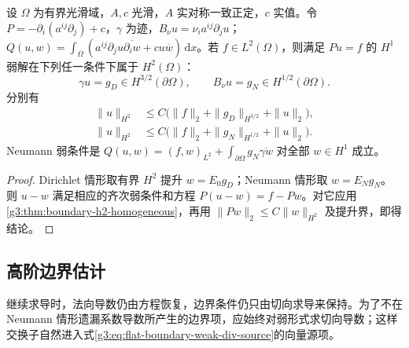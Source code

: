 \begin{corollary}\label{g3:cor:boundary-h2-inhomogeneous}
	设 \(\Omega\) 为有界光滑域，\(A,c\) 光滑，\(A\) 实对称一致正定，\(c\) 实值。令 \(P=-\partial_i(a^{ij}\partial_j)+c\)，\(\gamma\) 为迹，\(B_\nu u=\nu_i a^{ij}\partial_ju\)；\(Q(u,w)=\int_\Omega(a^{ij}\partial_ju\overline{\partial_iw}+cu\overline w)\,\mathrm dx\)。若 \(f\in L^2(\Omega)\)，则满足 \(Pu=f\) 的 \(H^1\) 弱解在下列任一条件下属于 \(H^2(\Omega)\)：
	\[
	\gamma u=g_D\in H^{3/2}(\partial\Omega),\qquad
	B_\nu u=g_N\in H^{1/2}(\partial\Omega).
	\]
	分别有
	\[
	\begin{split}
	\|u\|_{H^2}&\le C\bigl(\|f\|_2+\|g_D\|_{H^{3/2}}+\|u\|_2\bigr),\\
	\|u\|_{H^2}&\le C\bigl(\|f\|_2+\|g_N\|_{H^{1/2}}+\|u\|_2\bigr).
	\end{split}
	\]
	Neumann 弱条件是
	\(Q(u,w)=(f,w)_{L^2}+\int_{\partial\Omega}g_N\overline{\gamma w}\)
	对全部 \(w\in H^1\) 成立。
\end{corollary}
\begin{proof}
	Dirichlet 情形取有界 \(H^2\) 提升 \(w=E_0g_D\)；Neumann 情形取 \(w=E_Ng_N\)。则 \(u-w\) 满足相应的齐次弱条件和方程
	\(P(u-w)=f-Pw\)。对它应用\cref{g3:thm:boundary-h2-homogeneous}，再用
	\(\|Pw\|_2\le C\|w\|_{H^2}\) 及提升界，即得结论。
\end{proof}

\subsection{高阶边界估计}
\label{g3:subsec:1402:04}
继续求导时，法向导数仍由方程恢复，边界条件仍只由切向求导来保持。为了不在 Neumann 情形遗漏系数导数所产生的边界项，应始终对弱形式求切向导数；这样交换子自然进入式\eqref{g3:eq:flat-boundary-weak-div-source}的向量源项。

